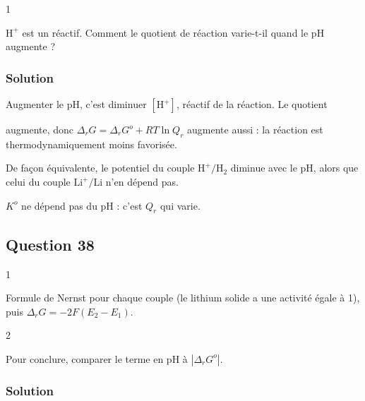 \documentclass[11pt,a4paper]{article}
\newcommand{\equationajustee}[1]{%
  \sbox{\boiteequation}{$\displaystyle #1$}%
  \ifdim\wd\boiteequation>\linewidth
    \[\resizebox{\linewidth}{!}{\usebox{\boiteequation}}\]%
  \else
    \[#1\]%
  \fi}
\begin{document}
\begin{indication}{1}

\(\mathrm{H^+}\) est un réactif. Comment le quotient de réaction varie-t-il quand le pH augmente ?

\end{indication}

\hypertarget{solution-36}{%
\subsubsection{Solution}\label{solution-36}}

Augmenter le pH, c'est diminuer \([\mathrm{H^+}]\), réactif de la réaction. Le quotient

\equationajustee{Q_r=\frac{[\mathrm{Li^+}]^2\,p(\mathrm{H_2})/p^o}{[\mathrm{H^+}]^2}}

augmente, donc \(\Delta_rG=\Delta_rG^o+RT\ln Q_r\) augmente aussi : la réaction est thermodynamiquement moins favorisée.

De façon équivalente, le potentiel du couple \(\mathrm{H^+/H_2}\) diminue avec le pH, alors que celui du couple \(\mathrm{Li^+/Li}\) n'en dépend pas.

\begin{piege}

\(K^o\) ne dépend pas du pH : c'est \(Q_r\) qui varie.

\end{piege}

\hypertarget{question-38}{%
\subsection{Question 38}\label{question-38}}

\begin{indication}{1}

Formule de Nernst pour chaque couple (le lithium solide a une activité égale à 1), puis \(\Delta_rG=-2F(E_2-E_1)\).

\end{indication}

\begin{indication}{2}

Pour conclure, comparer le terme en pH à \(|\Delta_rG^o|\).

\end{indication}

\hypertarget{solution-37}{%
\subsubsection{Solution}\label{solution-37}}
\end{document}
